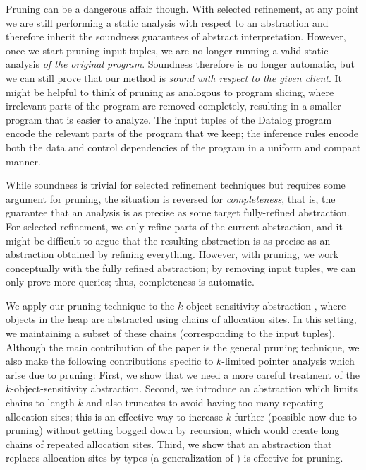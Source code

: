Pruning can be a dangerous affair though.  With selected refinement, at any
point we are still performing a static analysis with respect to an abstraction
and therefore inherit the soundness guarantees of abstract interpretation.
However, once we start pruning input tuples, we are no longer running a valid
static analysis {\em of the original program}.  Soundness therefore is no longer automatic,
but we can still prove that our method is {\em sound with respect to the given client}.
It might be helpful to think of pruning as analogous to program slicing, where irrelevant parts of the
program are removed completely, resulting in a smaller program that is easier
to analyze.  The input tuples of the Datalog program encode the relevant parts of the
program that we keep; the inference rules encode both the data and control
dependencies of the program in a uniform and compact manner.

While soundness is trivial for selected refinement techniques but requires some
argument for pruning, the situation is reversed for {\em completeness}, that
is, the guarantee that an analysis is as precise as some target fully-refined abstraction.  For selected
refinement, we only refine parts of the current abstraction, and it might be
difficult to argue that the resulting abstraction is as precise as an
abstraction obtained by refining everything.  However, with pruning, we work
conceptually with the fully refined abstraction; by removing input tuples, we
can only prove more queries; thus, completeness is automatic.


We apply our pruning technique to the $k$-object-sensitivity abstraction
\cite{kobj}, where objects in the heap are abstracted using chains of
allocation sites.  In this setting, we maintaining a subset
of these chains (corresponding to the input tuples).  Although the main contribution of the paper is the general
pruning technique, we also make the following contributions specific to
$k$-limited pointer analysis which arise due to pruning: First, we show
that we need a more careful treatment of the $k$-object-sensitivity abstraction.
Second, we introduce an abstraction which limits
chains to length $k$ and also truncates to avoid having too many repeating
allocation sites; this is an effective way to increase $k$ further (possible now due to
pruning) without getting bogged down by recursion, which would create long
chains of repeated allocation sites.  Third, we show that an abstraction that
replaces allocation sites by types (a generalization of
\cite{smaragdakis11context}) is effective for pruning.

